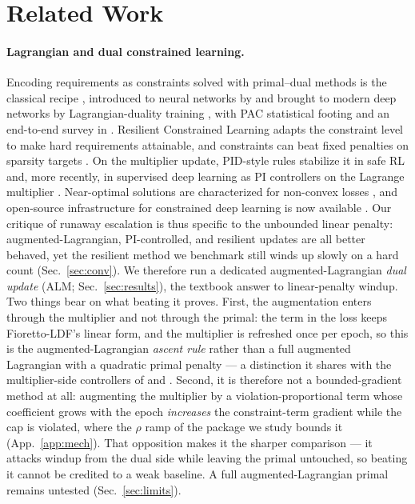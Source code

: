 \documentclass[10pt]{article}
\begin{document}
\section{Related Work}
\label{sec:related}

\paragraph{Lagrangian and dual constrained learning.}
Encoding requirements as constraints solved with primal--dual methods is
the classical recipe \citep{bertsekas1982constrained}{, introduced} to neural networks by \citet{platt1988constrained} and brought
to modern deep networks by Lagrangian-duality training
\citep{fioretto2020lagrangian}, with PAC statistical footing
\citep{chamon2020probably,chamon2022constrained} and an end-to-end survey
in \citet{kotary2021end}. Resilient Constrained Learning
\citep{hounie2023resilient} adapts the constraint level to make hard
requirements attainable, and constraints can beat fixed penalties on
sparsity targets \citep{gallego2022controlled}. %
{On the multiplier update, PID-style rules stabilize it in safe RL}
\citep{stooke2020responsive} and, more recently, in supervised deep
learning as PI controllers on the Lagrange multiplier
\citep{sohrabi2024pi}. {Near-optimal solutions are characterized} for non-convex losses
\citep{elenter2024near}, and open-source infrastructure for constrained
deep learning is now available \citep{gallego2024cooper}. Our critique of
runaway escalation is thus specific to the unbounded linear penalty:
augmented-Lagrangian, PI-controlled, and resilient updates are all better
behaved, yet the resilient method we benchmark still winds up slowly on a
hard count (Sec.~\ref{sec:conv}). 
{We therefore run a dedicated augmented-Lagrangian \emph{dual update}
(ALM; Sec.~\ref{sec:results}), the textbook answer to linear-penalty windup. {Two things bear on what beating it proves. First, the} augmentation enters through the multiplier and not through the
primal: the term in the loss keeps Fioretto-LDF's linear form, and the multiplier
is refreshed once per epoch, so this is the augmented-Lagrangian \emph{ascent
rule} rather than a full augmented Lagrangian with a quadratic primal penalty
\citep{bertsekas1982constrained} --- a distinction it shares with the
multiplier-side controllers of \citet{stooke2020responsive} and
\citet{sohrabi2024pi}. Second, it is therefore not a bounded-gradient method at
all: augmenting the multiplier by a violation-proportional term whose coefficient
grows with the epoch \emph{increases} the constraint-term gradient while the cap
is violated, where the $\rho$ ramp of the package we study bounds it
(App.~\ref{app:mech}). That opposition {makes} it the sharper comparison
--- it attacks windup from the dual side while leaving the primal {untouched}, so beating it cannot be credited to {a weak baseline}. A full
augmented-Lagrangian primal remains untested (Sec.~\ref{sec:limits}).}
\end{document}
